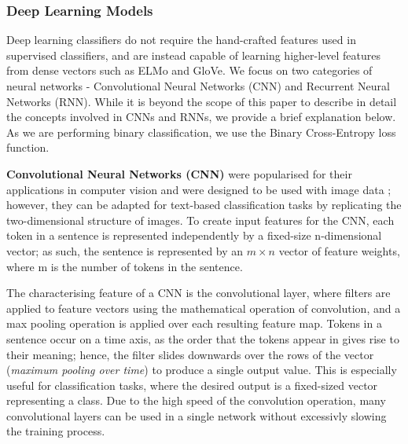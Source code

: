 \documentclass[12pt,a4paper]{article}
\begin{document}
\subsubsection{Deep Learning Models}
Deep learning classifiers do not require the  hand-crafted features used in supervised classifiers, and are instead capable of learning higher-level features from dense vectors such as ELMo and GloVe. We focus on two categories of neural networks - Convolutional Neural Networks (CNN) and Recurrent Neural Networks (RNN). While it is beyond the scope of this paper to describe in detail the concepts involved in CNNs and RNNs, we provide a brief explanation below. As we are performing binary classification, we use the Binary Cross-Entropy loss function.\\\vspace{-5pt}

\noindent \textbf{Convolutional Neural Networks (CNN)}\cite{lecun1998gradient} were popularised for their applications in computer vision and were designed to be used with image data \cite{krizhevsky2012imagenet}; however, they can be adapted for text-based classification tasks by replicating the two-dimensional structure of images. To create input features for the CNN, each token in a sentence is represented independently by a fixed-size n-dimensional vector; as such, the sentence is represented by an $m \times n$ vector of feature weights, where m is the number of tokens in the sentence.

\noindent The characterising feature of a CNN is the convolutional layer, where filters are applied to feature vectors using the mathematical operation of convolution, and a max pooling operation is applied over each resulting feature map. Tokens in a sentence occur on a time axis, as the order that the tokens appear in gives rise to their meaning; hence, the filter slides downwards over the rows of the vector (\textit{maximum pooling over time}) to produce a single output value. This is especially useful for classification tasks, where the desired output is a fixed-sized vector representing a class. Due to the high speed of the convolution operation, many convolutional layers can be used in a single network without excessivly slowing the training process.
\end{document}
